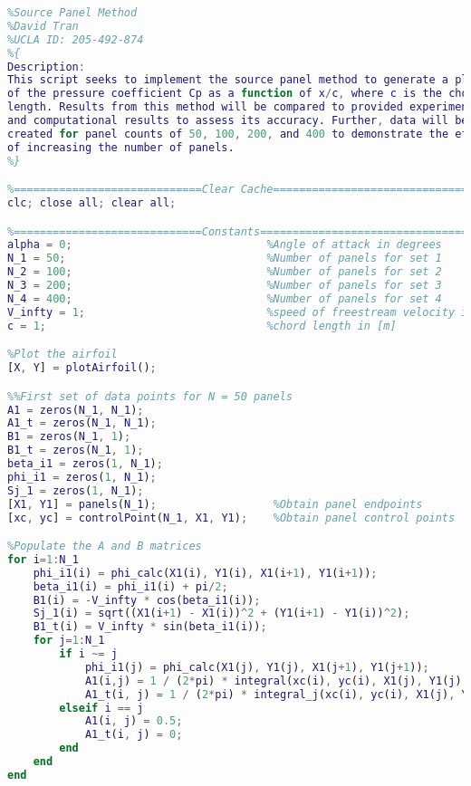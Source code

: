 \documentclass[12pt]{article}
\begin{document}
\begin{lstlisting}[language=Matlab]
%==========================================================================
%Source Panel Method
%David Tran
%UCLA ID: 205-492-874
%{
Description:
This script seeks to implement the source panel method to generate a plot
of the pressure coefficient Cp as a function of x/c, where c is the chord
length. Results from this method will be compared to provided experimental
and computational results to assess its accuracy. Further, data will be
created for panel counts of 50, 100, 200, and 400 to demonstrate the effect
of increasing the number of panels.
%}

%=============================Clear Cache==================================
clc; close all; clear all;

%=============================Constants====================================
alpha = 0;                              %Angle of attack in degrees
N_1 = 50;                               %Number of panels for set 1
N_2 = 100;                              %Number of panels for set 2
N_3 = 200;                              %Number of panels for set 3
N_4 = 400;                              %Number of panels for set 4
V_infty = 1;                            %speed of freestream velocity in [m/s]
c = 1;                                  %chord length in [m]

%Plot the airfoil
[X, Y] = plotAirfoil();

%%First set of data points for N = 50 panels
A1 = zeros(N_1, N_1);
A1_t = zeros(N_1, N_1);
B1 = zeros(N_1, 1);
B1_t = zeros(N_1, 1);
beta_i1 = zeros(1, N_1);
phi_i1 = zeros(1, N_1);
Sj_1 = zeros(1, N_1);
[X1, Y1] = panels(N_1);                  %Obtain panel endpoints
[xc, yc] = controlPoint(N_1, X1, Y1);    %Obtain panel control points

%Populate the A and B matrices
for i=1:N_1
    phi_i1(i) = phi_calc(X1(i), Y1(i), X1(i+1), Y1(i+1));
    beta_i1(i) = phi_i1(i) + pi/2;
    B1(i) = -V_infty * cos(beta_i1(i)); 
    Sj_1(i) = sqrt((X1(i+1) - X1(i))^2 + (Y1(i+1) - Y1(i))^2);
    B1_t(i) = V_infty * sin(beta_i1(i));
    for j=1:N_1
        if i ~= j
            phi_i1(j) = phi_calc(X1(j), Y1(j), X1(j+1), Y1(j+1));
            A1(i,j) = 1 / (2*pi) * integral(xc(i), yc(i), X1(j), Y1(j), X1(j+1), Y1(j+1), phi_i1(i), phi_i1(j));
            A1_t(i, j) = 1 / (2*pi) * integral_j(xc(i), yc(i), X1(j), Y1(j), X1(j+1), Y1(j+1), phi_i1(i), phi_i1(j));
        elseif i == j
            A1(i, j) = 0.5;
            A1_t(i, j) = 0;
        end
    end
end


\end{lstlisting}
\end{document}
